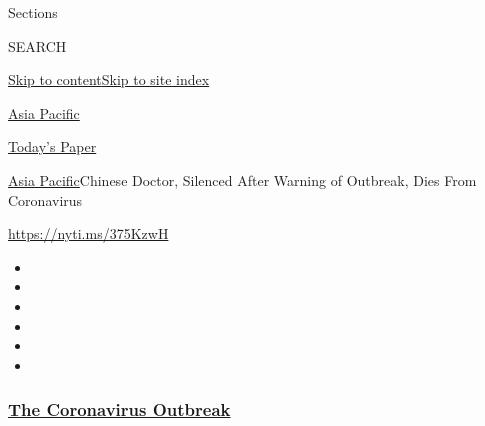 Sections

SEARCH

\protect\hyperlink{site-content}{Skip to
content}\protect\hyperlink{site-index}{Skip to site index}

\href{https://www.nytimes3xbfgragh.onion/section/world/asia}{Asia
Pacific}

\href{https://myaccount.nytimes3xbfgragh.onion/auth/login?response_type=cookie\&client_id=vi}{}

\href{https://www.nytimes3xbfgragh.onion/section/todayspaper}{Today's
Paper}

\href{/section/world/asia}{Asia Pacific}\textbar{}Chinese Doctor,
Silenced After Warning of Outbreak, Dies From Coronavirus

\url{https://nyti.ms/375KzwH}

\begin{itemize}
\item
\item
\item
\item
\item
\item
\end{itemize}

\hypertarget{the-coronavirus-outbreak}{%
\subsubsection{\texorpdfstring{\href{https://www.nytimes3xbfgragh.onion/news-event/coronavirus?name=styln-coronavirus-national\&region=TOP_BANNER\&block=storyline_menu_recirc\&action=click\&pgtype=Article\&impression_id=51fdae50-f1f6-11ea-9d6d-29bb2f94ebc1\&variant=undefined}{The
Coronavirus
Outbreak}}{The Coronavirus Outbreak}}\label{the-coronavirus-outbreak}}

